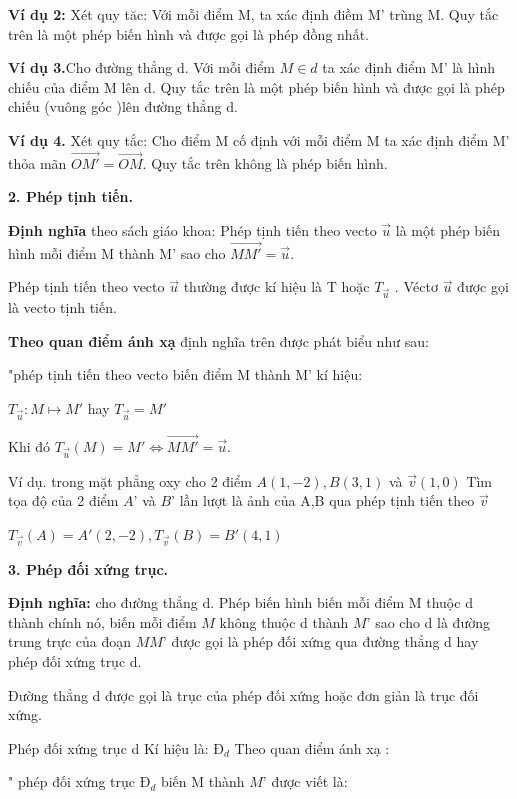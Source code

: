 \documentclass[12pt,oneside,a4paper,reqno]{book}
\begin{document}
\textbf{Ví dụ 2:} Xét quy tăc: Với mỗi điểm M, ta xác định điềm M’ trùng M. Quy tắc trên là một phép biến hình và được gọi là phép đồng nhất.

\textbf{Ví dụ 3.}Cho đường thẳng d. Với mỗi điểm $M\in d$ ta xác định điểm M’ là hình chiếu của  điểm M lên d. Quy tắc trên là một phép biến hình và được gọi là phép chiếu (vuông góc )lên đường thẳng d.

\textbf{Ví dụ 4.} Xét quy tắc: Cho điểm M cố định với mỗi điểm M ta xác định điểm M’ thỏa mãn $\overrightarrow{OM'}=\overrightarrow{OM}$. Quy tắc trên không là phép biến hình.

\textbf{2. Phép tịnh tiến.}

    \textbf{Định nghĩa }theo sách giáo khoa: Phép tịnh tiến theo vecto $\overrightarrow{u}$ là một phép biến hình  mỗi điểm M thành M’ sao cho $\overrightarrow{MM'}=\overrightarrow{u}.$

Phép tịnh tiến theo vecto $\overrightarrow{u}$ thường được kí hiệu là T hoặc $T_{\overrightarrow{u}}$ . Véctơ $\overrightarrow{u}$  được gọi là vecto tịnh tiến.

\textbf{Theo quan điểm ánh xạ }định nghĩa trên được phát biểu như sau:

"phép tịnh tiến theo vecto  biến điểm M thành M’ kí hiệu:

$T_{\overrightarrow{u}}:M \mapsto M'$ hay $T_{\overrightarrow{u}}=M'$

Khi đó $T_{\overrightarrow{u}}(M)=M' \Leftrightarrow \overrightarrow{MM'}=\overrightarrow{u}.$


Ví dụ. trong mặt phẳng oxy cho 2 điểm $A(1,-2), B(3,1)$ và $\overrightarrow{v}(1,0)$ Tìm tọa độ của 2 điểm $A’$ và $B$’ lần lượt là ảnh của A,B qua phép tịnh tiến theo $\overrightarrow{v}$   

$T_{\overrightarrow{v}}(A)=A'(2,-2),T_{\overrightarrow{v}}(B)=B'(4,1)$

\textbf{3. Phép đối xứng trục.}

   \textbf{   Định nghĩa:} cho đường thẳng d. Phép biến hình biến mỗi điểm M thuộc d thành chính nó, biến mỗi điểm $M$ không thuộc d thành $M’$ sao cho d là đường trung trực của đoạn $MM’$ được gọi là phép đối xứng qua đường thẳng d hay phép đối xứng trục d.
   
Đường thẳng d được gọi là trục của phép đối xứng hoặc đơn giản là trục đối xứng.

 Phép đối xứng trục d Kí hiệu là: $\text{Đ}_d $
Theo quan điểm ánh xạ :

" phép đối xứng trục $\text{Đ}_d$  biến M thành $M’$ được viết là:
\end{document}

